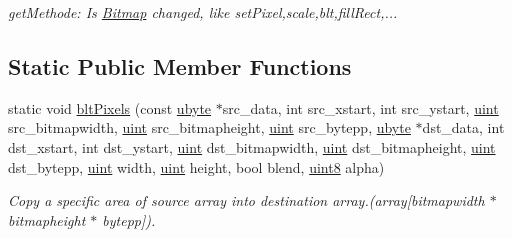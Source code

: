 \begin{DoxyCompactItemize}
\begin{DoxyCompactList}\small\item\em getMethode: Is \hyperlink{class_f2_c_1_1_bitmap}{Bitmap} changed, like setPixel,scale,blt,fillRect,... \item\end{DoxyCompactList}\end{DoxyCompactItemize}
\subsection*{Static Public Member Functions}
\begin{DoxyCompactItemize}
\item 
static void \hyperlink{class_f2_c_1_1_bitmap_a105376f621818668ac174d4a217155dd}{bltPixels} (const \hyperlink{namespace_f2_c_a74fad364688add30796d711e5635ac77}{ubyte} $\ast$src\_\-data, int src\_\-xstart, int src\_\-ystart, \hyperlink{namespace_f2_c_a58be2bac9eb3e3c99cb41b6008bf4fae}{uint} src\_\-bitmapwidth, \hyperlink{namespace_f2_c_a58be2bac9eb3e3c99cb41b6008bf4fae}{uint} src\_\-bitmapheight, \hyperlink{namespace_f2_c_a58be2bac9eb3e3c99cb41b6008bf4fae}{uint} src\_\-bytepp, \hyperlink{namespace_f2_c_a74fad364688add30796d711e5635ac77}{ubyte} $\ast$dst\_\-data, int dst\_\-xstart, int dst\_\-ystart, \hyperlink{namespace_f2_c_a58be2bac9eb3e3c99cb41b6008bf4fae}{uint} dst\_\-bitmapwidth, \hyperlink{namespace_f2_c_a58be2bac9eb3e3c99cb41b6008bf4fae}{uint} dst\_\-bitmapheight, \hyperlink{namespace_f2_c_a58be2bac9eb3e3c99cb41b6008bf4fae}{uint} dst\_\-bytepp, \hyperlink{namespace_f2_c_a58be2bac9eb3e3c99cb41b6008bf4fae}{uint} width, \hyperlink{namespace_f2_c_a58be2bac9eb3e3c99cb41b6008bf4fae}{uint} height, bool blend, \hyperlink{namespace_f2_c_a711deb33697d145669b9c0c4fe87c7ca}{uint8} alpha)
\begin{DoxyCompactList}\small\item\em Copy a specific area of source array into destination array.(array\mbox{[}bitmapwidth $\ast$ bitmapheight $\ast$ bytepp\mbox{]}). \item\end{DoxyCompactList}\end{DoxyCompactItemize}
